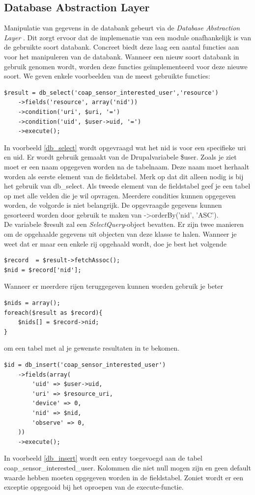 \subsection{Database Abstraction Layer}
Manipulatie van gegevens in de databank gebeurt via de \textit{Database Abstraction Layer} \cite{databaseAbstractionLayer}. Dit zorgt ervoor dat de implemenatie van een module onafhankelijk is van de gebruikte soort databank. Concreet biedt deze laag een aantal functies aan voor het manipuleren van de databank. Wanneer een nieuw soort databank in gebruik genomen wordt, worden deze functies ge\"{i}mplementeerd voor deze nieuwe soort. We geven enkele voorbeelden van de meest gebruikte functies:
\lstset{language=PHP}
\begin{lstlisting}[label=db_select,caption=Voorbeeld gebruik van db\_select]
$result = db_select('coap_sensor_interested_user','resource')
	->fields('resource', array('nid'))
	->condition('uri', $uri, '=')
	->condition('uid', $user->uid, '=')
	->execute();
\end{lstlisting}
In voorbeeld \ref{db_select} wordt opgevraagd wat het nid is voor een specifieke uri en uid. Er wordt gebruik gemaakt van de Drupalvariabele \$user. Zoals je ziet moet er een naam opgegeven worden na de tabelnaam. Deze naam moet herhaalt worden als eerste element van de fieldstabel. Merk op dat dit alleen nodig is bij het gebruik van db\_select. Als tweede element van de fieldstabel geef je een tabel op met alle velden die je wil opvragen. Meerdere condities kunnen opgegeven worden, de volgorde is niet belangrijk. De opgevraagde gegevens kunnen gesorteerd worden door gebruik te maken van -\textgreater orderBy('nid', 'ASC').\\

De variabele \$result zal een \textit{SelectQuery}-object bevatten. Er zijn twee manieren om de opgehaalde gegevens uit objecten van deze klasse te halen. Wanneer je weet dat er maar een enkele rij opgehaald wordt, doe je best het volgende
\lstset{language=PHP}
\begin{lstlisting}
$record  = $result->fetchAssoc();
$nid = $record['nid'];
\end{lstlisting} 
Wanneer er meerdere rijen teruggegeven kunnen worden gebruik je beter
\lstset{language=PHP}
\begin{lstlisting}
$nids = array();
foreach($result as $record){
	$nids[] = $record->nid;
}
\end{lstlisting} 
om een tabel met al je gewenste resultaten in te bekomen. %
\lstset{language=PHP}
\begin{lstlisting}[label=db_insert,caption=Voorbeeld gebruik van db\_insert]
$id = db_insert('coap_sensor_interested_user')
	->fields(array(
		'uid' => $user->uid,
		'uri' => $resource_uri,
		'device' => 0,
		'nid' => $nid,
		'observe' => 0,
	))
	->execute();
\end{lstlisting}
In voorbeeld \ref{db_insert} wordt een entry toegevoegd aan de tabel coap\_sensor\_interested\_user. Kolommen die niet null mogen zijn en geen default waarde hebben moeten opgegeven worden in de fieldstabel. Zoniet wordt er een exceptie opgegooid bij het oproepen van de execute-functie.

